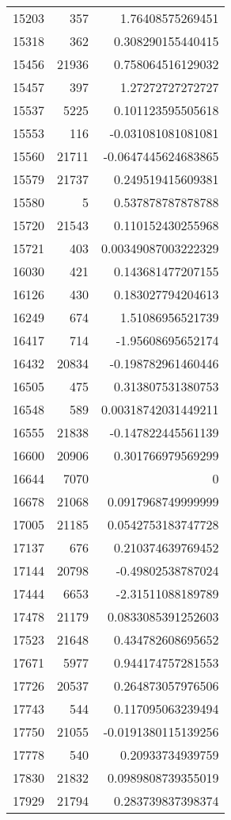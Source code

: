 \begin{tabular}{r | r | r}
15203 & 357 & 1.76408575269451 \\
15318 & 362 & 0.308290155440415 \\
15456 & 21936 & 0.758064516129032 \\
15457 & 397 & 1.27272727272727 \\
15537 & 5225 & 0.101123595505618 \\
15553 & 116 & -0.031081081081081 \\
15560 & 21711 & -0.0647445624683865 \\
15579 & 21737 & 0.249519415609381 \\
15580 & 5 & 0.537878787878788 \\
15720 & 21543 & 0.110152430255968 \\
15721 & 403 & 0.00349087003222329 \\
16030 & 421 & 0.143681477207155 \\
16126 & 430 & 0.183027794204613 \\
16249 & 674 & 1.51086956521739 \\
16417 & 714 & -1.95608695652174 \\
16432 & 20834 & -0.198782961460446 \\
16505 & 475 & 0.313807531380753 \\
16548 & 589 & 0.00318742031449211 \\
16555 & 21838 & -0.147822445561139 \\
16600 & 20906 & 0.301766979569299 \\
16644 & 7070 & 0 \\
16678 & 21068 & 0.0917968749999999 \\
17005 & 21185 & 0.0542753183747728 \\
17137 & 676 & 0.210374639769452 \\
17144 & 20798 & -0.49802538787024 \\
17444 & 6653 & -2.31511088189789 \\
17478 & 21179 & 0.0833085391252603 \\
17523 & 21648 & 0.434782608695652 \\
17671 & 5977 & 0.944174757281553 \\
17726 & 20537 & 0.264873057976506 \\
17743 & 544 & 0.117095063239494 \\
17750 & 21055 & -0.0191380115139256 \\
17778 & 540 & 0.20933734939759 \\
17830 & 21832 & 0.0989808739355019 \\
17929 & 21794 & 0.283739837398374 \\

\end{tabular}
